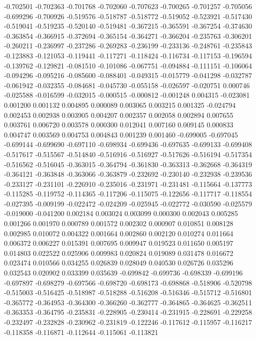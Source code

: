 -0.702501
-0.702363
-0.701768
-0.702060
-0.707623
-0.700265
-0.701257
-0.705056
-0.699296
-0.700926
-0.519576
-0.518787
-0.518772
-0.519052
-0.523921
-0.517430
-0.519041
-0.519235
-0.520140
-0.519481
-0.367215
-0.365591
-0.367254
-0.374630
-0.363854
-0.366915
-0.372694
-0.365154
-0.364271
-0.366204
-0.235763
-0.306201
-0.260211
-0.236997
-0.237286
-0.269283
-0.236199
-0.233136
-0.248761
-0.235843
-0.123883
-0.121053
-0.119441
-0.117271
-0.118424
-0.116734
-0.117153
-0.196594
-0.139762
-0.129821
-0.081510
-0.101086
-0.067751
-0.094884
-0.111151
-0.106064
-0.094296
-0.095216
-0.085600
-0.088401
-0.049315
-0.015779
-0.041298
-0.032787
-0.061942
-0.032355
-0.084681
-0.045730
-0.055158
-0.026597
-0.020751
0.000746
-0.025588
-0.016599
-0.032015
-0.000515
-0.000812
-0.001248
0.004315
-0.023081
0.001200
0.001132
0.004895
0.000089
0.003065
0.003215
0.001325
-0.024794
0.002453
0.002938
0.003905
0.004207
0.002357
0.002058
0.002894
0.007655
0.003761
0.006720
0.003578
0.000300
0.012041
0.007160
0.009145
0.000833
0.004747
0.003569
0.004753
0.004843
0.001239
0.001460
-0.699005
-0.697045
-0.699144
-0.699690
-0.697110
-0.698934
-0.699436
-0.697635
-0.699133
-0.699408
-0.517617
-0.515567
-0.514840
-0.516916
-0.516927
-0.517626
-0.516194
-0.517354
-0.516562
-0.516045
-0.363015
-0.364794
-0.361830
-0.363313
-0.362668
-0.364319
-0.364121
-0.363848
-0.363066
-0.363879
-0.232692
-0.230140
-0.232938
-0.239536
-0.233127
-0.231101
-0.226910
-0.235016
-0.231971
-0.231481
-0.115664
-0.137773
-0.115285
-0.119752
-0.114365
-0.117206
-0.115075
-0.122656
-0.117717
-0.118554
-0.027395
-0.009199
-0.022472
-0.024209
-0.025945
-0.022772
-0.030590
-0.025579
-0.019000
-0.041200
0.002184
0.003024
0.003099
0.000300
0.002043
0.005285
0.001266
0.001970
0.000789
0.001572
0.002302
0.000907
0.010851
0.008128
0.002985
0.010072
0.004322
0.001664
0.002860
0.002120
0.010274
0.011664
0.006372
0.006227
0.015391
0.007695
0.009947
0.019523
0.011650
0.005197
0.014803
0.022522
0.025906
0.009983
0.020824
0.019089
0.031478
0.016672
0.023474
0.010566
0.034255
0.026839
0.028049
0.040530
0.026726
0.035296
0.032543
0.020902
0.033399
0.035639
-0.699842
-0.699736
-0.698339
-0.699196
-0.697897
-0.698279
-0.697566
-0.698720
-0.698173
-0.698868
-0.518906
-0.520798
-0.515003
-0.516425
-0.518987
-0.518288
-0.516208
-0.516346
-0.515712
-0.516801
-0.365772
-0.364953
-0.364300
-0.366260
-0.362777
-0.364865
-0.364625
-0.362511
-0.363353
-0.364795
-0.235831
-0.228905
-0.230414
-0.231915
-0.228691
-0.229258
-0.232497
-0.232828
-0.230962
-0.231819
-0.122246
-0.117612
-0.115957
-0.116217
-0.118358
-0.116871
-0.112644
-0.115061
-0.113821
